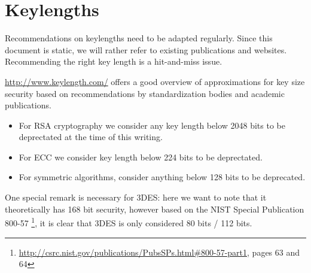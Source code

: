 \section{Keylengths}
\label{section:keylengths}

Recommendations on keylengths need to be adapted regularly. Since this document
is static, we will rather refer to existing publications and websites.
Recommending the right key length is a hit-and-miss issue.

\url{http://www.keylength.com/} offers a good overview of approximations for
key size security based on recommendations by standardization bodies and
academic publications.

\begin{itemize}
\item For RSA cryptography we consider any key length below 2048 bits to be
deprectated at the time of this writing.  
\item For ECC we consider key length below
224 bits to be deprectated.  
\item For symmetric algorithms, consider anything below
128 bits to be deprecated.
\end{itemize}


One special remark is necessary for 3DES: here we want to note that it
theoretically has 168 bit security, however based on the NIST Special
Publication 800-57
\footnote{\url{http://csrc.nist.gov/publications/PubsSPs.html\#800-57-part1},
pages 63 and 64}, it is clear that 3DES is only considered 80 bits / 112 bits.





